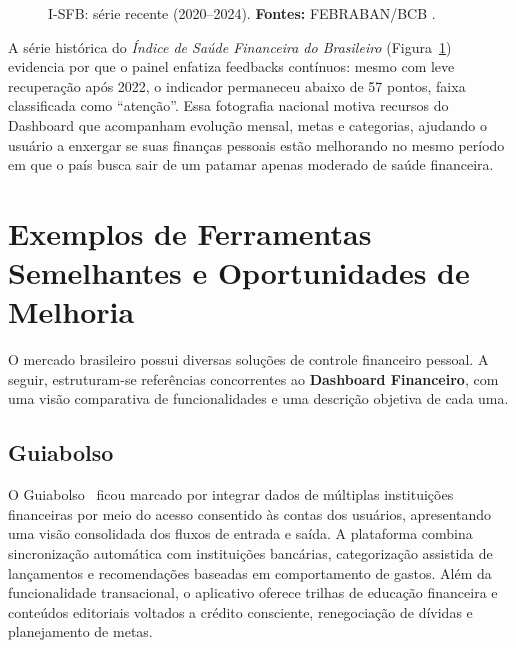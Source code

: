 \begin{figure}[ht]
\centering
{}
\caption{I-SFB: série recente (2020–2024). \textbf{Fontes:} FEBRABAN/BCB \cite{FEBRABAN2022,BCB2024,ISFB2024}.}
\label{fig:isfb_serie}
\end{figure}

A série histórica do \textit{Índice de Saúde Financeira do Brasileiro} (Figura~\ref{fig:isfb_serie}) evidencia por que o painel enfatiza feedbacks contínuos: mesmo com leve recuperação após 2022, o indicador permaneceu abaixo de 57 pontos, faixa classificada como ``atenção''. Essa fotografia nacional motiva recursos do Dashboard que acompanham evolução mensal, metas e categorias, ajudando o usuário a enxergar se suas finanças pessoais estão melhorando no mesmo período em que o país busca sair de um patamar apenas moderado de saúde financeira.

\section{Exemplos de Ferramentas Semelhantes e Oportunidades de Melhoria}
O mercado brasileiro possui diversas soluções de controle financeiro pessoal. A seguir, estruturam-se referências concorrentes ao \textbf{Dashboard Financeiro}, com uma visão comparativa de funcionalidades e uma descrição objetiva de cada uma.

\subsection{Guiabolso}\label{subsec:guiabolso}

O Guiabolso~\cite{GUIABOLSO2021} ficou marcado por integrar dados de múltiplas instituições financeiras por meio do acesso consentido às contas dos usuários, apresentando uma visão consolidada dos fluxos de entrada e saída. A plataforma combina sincronização automática com instituições bancárias, categorização assistida de lançamentos e recomendações baseadas em comportamento de gastos. Além da funcionalidade transacional, o aplicativo oferece trilhas de educação financeira e conteúdos editoriais voltados a crédito consciente, renegociação de dívidas e planejamento de metas.

